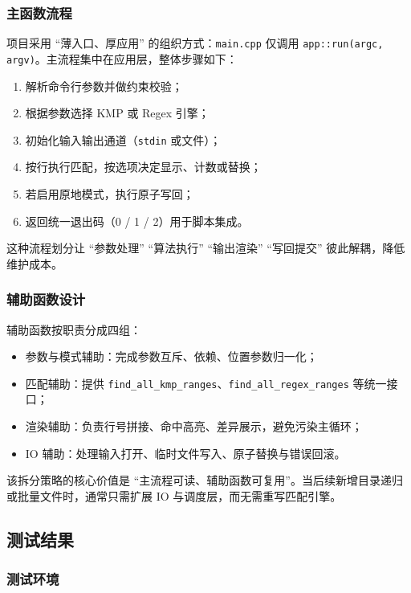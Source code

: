 \documentclass[12pt, a4paper]{ctexart}
\begin{document}
\subsubsection{主函数流程}

项目采用 ``薄入口、厚应用'' 的组织方式：\texttt{main.cpp} 仅调用 \texttt{app::run(argc, argv)}。主流程集中在应用层，整体步骤如下：

\begin{enumerate}
    \item 解析命令行参数并做约束校验；
    \item 根据参数选择 KMP 或 Regex 引擎；
    \item 初始化输入输出通道（\texttt{stdin} 或文件）；
    \item 按行执行匹配，按选项决定显示、计数或替换；
    \item 若启用原地模式，执行原子写回；
    \item 返回统一退出码（0 / 1 / 2）用于脚本集成。
\end{enumerate}

这种流程划分让 ``参数处理'' ``算法执行'' ``输出渲染'' ``写回提交'' 彼此解耦，降低维护成本。

\subsubsection{辅助函数设计}

辅助函数按职责分成四组：

\begin{itemize}
    \item 参数与模式辅助：完成参数互斥、依赖、位置参数归一化；
    \item 匹配辅助：提供 \texttt{find_all_kmp_ranges}、\texttt{find_all_regex_ranges} 等统一接口；
    \item 渲染辅助：负责行号拼接、命中高亮、差异展示，避免污染主循环；
    \item IO 辅助：处理输入打开、临时文件写入、原子替换与错误回滚。
\end{itemize}

该拆分策略的核心价值是 ``主流程可读、辅助函数可复用''。当后续新增目录递归或批量文件时，通常只需扩展 IO 与调度层，而无需重写匹配引擎。

\subsection{测试结果}

\subsubsection{测试环境}
\end{document}
